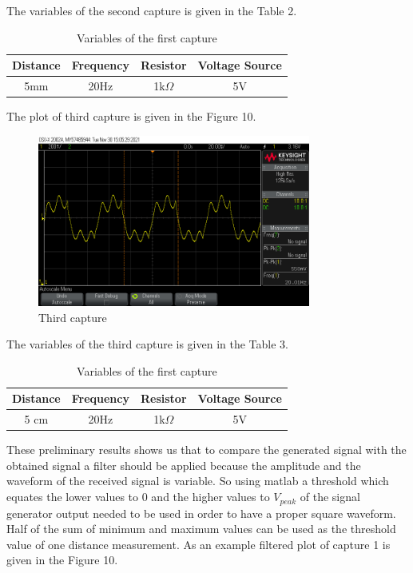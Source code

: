 \documentclass[letterpaper,12pt]{article}
\begin{document}
The variables of the second capture is given in the Table 2.
\begin{table}[H]
	\begin{center}
		\caption{Variables of the first capture}
		\vspace{2mm}
		\begin{tabular}{||c | c | c | c||} 
		 \hline
		 Distance & Frequency & Resistor & Voltage Source\\ [0.5ex] 
		 \hline\hline
		  5mm & 20Hz &  1k\( \Omega \) & 5V  \\ 
		 \hline
		\end{tabular}
	\end{center}
	\end{table}
The plot of third capture is given in the Figure 10.
\begin{figure}[H]
	\centering
   \includegraphics[width=0.8\textwidth]{capture3_ss 0.png}
   \caption{Third capture}
\end{figure} 
The variables of the third capture is given in the Table 3.
\begin{table}[H]
	\begin{center}
		\caption{Variables of the first capture}
		\vspace{2mm}
		\begin{tabular}{||c | c | c | c||} 
		 \hline
		 Distance & Frequency & Resistor & Voltage Source\\ [0.5ex] 
		 \hline\hline
		  5 cm & 20Hz &  1k\( \Omega \) & 5V  \\ 
		 \hline
		\end{tabular}
	\end{center}
	\end{table}
These preliminary results shows us that to compare the generated signal with the obtained signal a filter should be applied because the amplitude and the waveform of the received signal is variable. So using matlab a threshold which equates the  lower values to 0 and the higher values to \(V_{peak}\) of the signal generator output needed to be used in order to have a proper square waveform. Half of the sum of minimum and maximum values can be used as the threshold value of one distance measurement. As an example filtered plot of capture 1 is given in the Figure 10.
\end{document}
